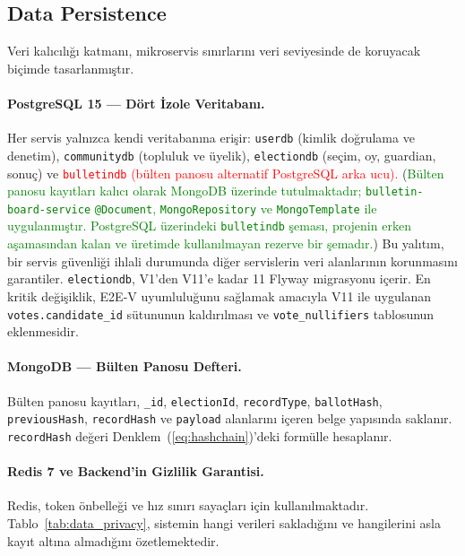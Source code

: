 \documentclass[a4paper,fleqn]{cas-sc}
\begin{document}
\subsection{Data Persistence}
\label{subsec:persistence}

Veri kalıcılığı katmanı, mikroservis sınırlarını veri seviyesinde de
koruyacak biçimde tasarlanmıştır.

\paragraph{PostgreSQL 15 — Dört İzole Veritabanı.}
Her servis yalnızca kendi veritabanına erişir:
\texttt{userdb} (kimlik doğrulama ve denetim),
\texttt{communitydb} (topluluk ve üyelik),
\texttt{electiondb} (seçim, oy, guardian, sonuç) ve
\textcolor{red}{\texttt{bulletindb} (bülten panosu alternatif PostgreSQL arka ucu).}
(\textcolor{green}{Bülten panosu kayıtları kalıcı olarak MongoDB üzerinde tutulmaktadır; \texttt{bulletin-board-service} \texttt{@Document}, \texttt{MongoRepository} ve \texttt{MongoTemplate} ile uygulanmıştır. PostgreSQL üzerindeki \texttt{bulletindb} şeması, projenin erken aşamasından kalan ve üretimde kullanılmayan rezerve bir şemadır.})
Bu yalıtım, bir servis güvenliği ihlali durumunda diğer servislerin
veri alanlarının korunmasını garantiler.
\texttt{electiondb}, V1'den V11'e kadar 11 Flyway migrasyonu içerir.
En kritik değişiklik, E2E-V uyumluluğunu sağlamak amacıyla V11 ile
uygulanan \texttt{votes.candidate\_id} sütununun kaldırılması ve
\texttt{vote\_nullifiers} tablosunun eklenmesidir.

\paragraph{MongoDB — Bülten Panosu Defteri.}
Bülten panosu kayıtları, \texttt{\_id}, \texttt{electionId},
\texttt{recordType}, \texttt{ballotHash}, \texttt{previousHash},
\texttt{recordHash} ve \texttt{payload} alanlarını içeren belge
yapısında saklanır.
\texttt{recordHash} değeri Denklem~(\ref{eq:hashchain})'deki formülle
hesaplanır.

\paragraph{Redis 7 ve Backend'in Gizlilik Garantisi.}
Redis, token önbelleği ve hız sınırı sayaçları için kullanılmaktadır.
Tablo~\ref{tab:data_privacy}, sistemin hangi verileri sakladığını ve
hangilerini asla kayıt altına almadığını özetlemektedir.
\end{document}
